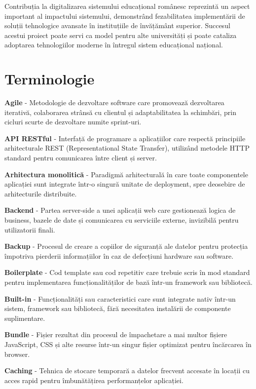 \documentclass[12pt,a4paper]{report}
\begin{document}
Contribuția la digitalizarea sistemului educațional românesc reprezintă un aspect important al impactului sistemului, demonstrând fezabilitatea implementării de soluții tehnologice avansate în instituțiile de învățământ superior. Succesul acestui proiect poate servi ca model pentru alte universități și poate cataliza adoptarea tehnologiilor moderne în întregul sistem educațional național.

\chapter{Terminologie}

\textbf{Agile} - Metodologie de dezvoltare software care promovează dezvoltarea iterativă, colaborarea strânsă cu clientul și adaptabilitatea la schimbări, prin cicluri scurte de dezvoltare numite sprint-uri.

\textbf{API RESTful} - Interfață de programare a aplicațiilor care respectă principiile arhitecturale REST (Representational State Transfer), utilizând metodele HTTP standard pentru comunicarea între client și server.

\textbf{Arhitectura monolitică} - Paradigmă arhitecturală în care toate componentele aplicației sunt integrate într-o singură unitate de deployment, spre deosebire de arhitecturile distribuite.

\textbf{Backend} - Partea server-side a unei aplicații web care gestionează logica de business, bazele de date și comunicarea cu serviciile externe, invizibilă pentru utilizatorii finali.

\textbf{Backup} - Procesul de creare a copiilor de siguranță ale datelor pentru protecția împotriva pierderii informațiilor în caz de defecțiuni hardware sau software.

\textbf{Boilerplate} - Cod template sau cod repetitiv care trebuie scris în mod standard pentru implementarea funcționalităților de bază într-un framework sau bibliotecă.

\textbf{Built-in} - Funcționalități sau caracteristici care sunt integrate nativ într-un sistem, framework sau bibliotecă, fără necesitatea instalării de componente suplimentare.

\textbf{Bundle} - Fișier rezultat din procesul de împachetare a mai multor fișiere JavaScript, CSS și alte resurse într-un singur fișier optimizat pentru încărcarea în browser.

\textbf{Caching} - Tehnica de stocare temporară a datelor frecvent accesate în locații cu acces rapid pentru îmbunătățirea performanțelor aplicației.
\end{document}

